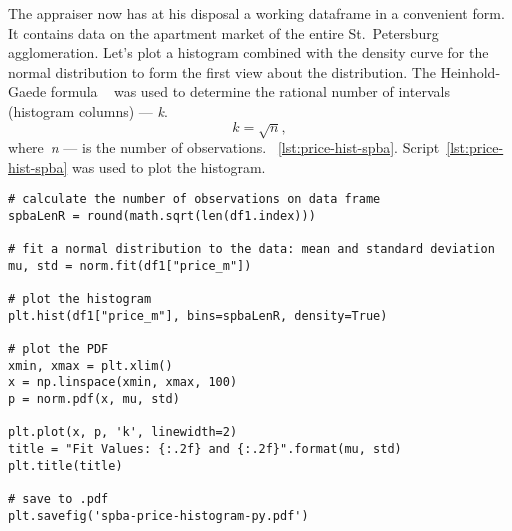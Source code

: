 \documentclass[]{scrreprt}
\begin{document}
The appraiser now has at his disposal a working dataframe in a convenient form. It contains data on the apartment market of the entire St.~Petersburg agglomeration. Let's plot a histogram combined with the density curve for the normal distribution to form the first view about the distribution. The Heinhold-Gaede formula ~\cite{Ingenieur-Statistik} was used to determine the rational number of intervals (histogram columns) --- \textit{k}.
\begin{equation}\label{eq:k-hist-Heinhold-Gaede}
k = \sqrt{n},
\end{equation}
where~\textit{n} --- is the number of observations. ~\ref{lst:price-hist-spba}. Script~\ref{lst:price-hist-spba} was used to plot the histogram.
%
\begin{lstlisting}[float, caption = Plotting the histogram for the agglomeration of St.~Petersburg., firstnumber=1, label= lst:price-hist-spba]
# calculate the number of observations on data frame
spbaLenR = round(math.sqrt(len(df1.index)))

# fit a normal distribution to the data: mean and standard deviation
mu, std = norm.fit(df1["price_m"])

# plot the histogram
plt.hist(df1["price_m"], bins=spbaLenR, density=True)

# plot the PDF
xmin, xmax = plt.xlim()
x = np.linspace(xmin, xmax, 100)
p = norm.pdf(x, mu, std)

plt.plot(x, p, 'k', linewidth=2)
title = "Fit Values: {:.2f} and {:.2f}".format(mu, std)
plt.title(title)

# save to .pdf
plt.savefig('spba-price-histogram-py.pdf')
\end{lstlisting}
%
\end{document}
